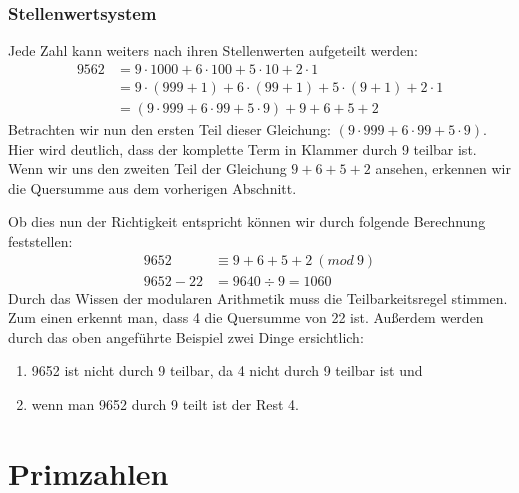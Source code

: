 \documentclass[12pt,a4paper]{article}
\theoremstyle{definition}
\begin{document}
\subsubsection{Stellenwertsystem}
Jede Zahl kann weiters nach ihren Stellenwerten aufgeteilt werden:
\begin{align}
9562 &= 9 \cdot 1000 + 6 \cdot 100 + 5 \cdot 10 + 2 \cdot 1 \\
&= 9 \cdot (999+1) + 6 \cdot (99+1) + 5 \cdot (9+1) + 2 \cdot 1 \\
&= (9 \cdot 999 + 6 \cdot 99 + 5 \cdot 9) + 9 + 6 + 5 + 2
\end{align}
Betrachten wir nun den ersten Teil dieser Gleichung: $(9 \cdot 999 + 6 \cdot 99 + 5 \cdot 9)$.
Hier wird deutlich, dass der komplette Term in Klammer durch 9 teilbar ist.
Wenn wir uns den zweiten Teil der Gleichung $9 + 6 + 5 + 2$ ansehen, erkennen wir die Quersumme aus dem vorherigen Abschnitt.

Ob dies nun der Richtigkeit entspricht können wir durch folgende Berechnung feststellen:
\begin{align}
9652      &\equiv 9 + 6 + 5 + 2\ (mod\ 9) \\
9652 - 22 &= 9640 \div 9 = 1060
\end{align}
Durch das Wissen der modularen Arithmetik muss die Teilbarkeitsregel stimmen.
Zum einen erkennt man, dass 4 die Quersumme von 22 ist.
Außerdem werden durch das oben angeführte Beispiel zwei Dinge ersichtlich:
\begin{enumerate}
    \item 9652 ist nicht durch 9 teilbar, da 4 nicht durch 9 teilbar ist und
    \item wenn man 9652 durch 9 teilt ist der Rest 4.
\end{enumerate}

\newpage
\section{Primzahlen}\label{Primzahlen}
\end{document}
